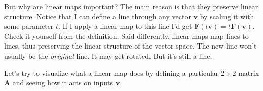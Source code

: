 \documentclass[
  letterpaper,
  DIV=11,
  numbers=noendperiod]{scrreprt}
\newenvironment{Shaded}{\begin{snugshade}}{\end{snugshade}}
\newcommand{\DecValTok}[1]{\textcolor[rgb]{0.68,0.00,0.00}{#1}}
\newcommand{\FloatTok}[1]{\textcolor[rgb]{0.68,0.00,0.00}{#1}}
\newcommand{\NormalTok}[1]{\textcolor[rgb]{0.00,0.23,0.31}{#1}}
\newcommand{\OperatorTok}[1]{\textcolor[rgb]{0.37,0.37,0.37}{#1}}
\newcommand{\SpecialCharTok}[1]{\textcolor[rgb]{0.37,0.37,0.37}{#1}}
\newcommand{\StringTok}[1]{\textcolor[rgb]{0.13,0.47,0.30}{#1}}
\begin{document}
But why are linear maps important? The main reason is that they preserve
linear structure. Notice that I can define a line through any vector
\(\mathbf{v}\) by scaling it with some parameter \(t\). If I apply a
linear map to this line I'd get
\(\mathbf{F}(t\mathbf{v}) = t\mathbf{F}(\mathbf{v})\). Check it yourself
from the definition. Said differently, linear maps map lines to lines,
thus preserving the linear structure of the vector space. The new line
won't usually be the \emph{original} line. It may get rotated. But it's
still a line.

Let's try to visualize what a linear map does by defining a particular
\(2 \times 2\) matrix \(\mathbf{A}\) and seeing how it acts on inputs
\(\mathbf{v}\).

\begin{Shaded}
\end{Shaded}
\end{document}

